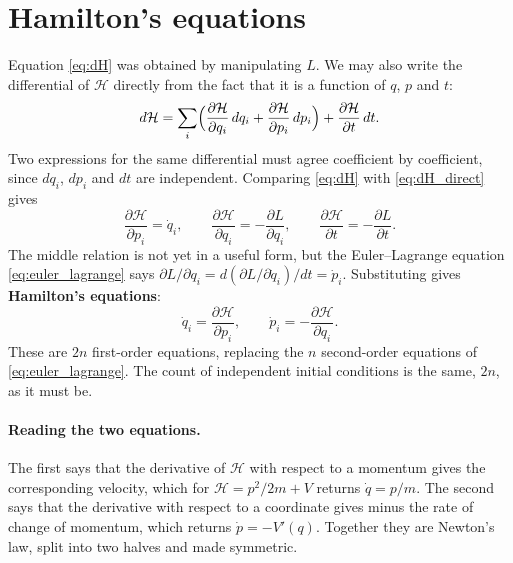 \documentclass[12pt]{article}
\newcommand{\Ham}{\mathcal{H}}
\begin{document}
\section{Hamilton's equations}
\label{sec:hamilton}

Equation \eqref{eq:dH} was obtained by manipulating $L$.  We may also
write the differential of $\Ham$ directly from the fact that it is a
function of $q$, $p$ and $t$:
%
\begin{equation}
  d\Ham = \sum_i\Bigl(\frac{\partial\Ham}{\partial q_i}\,dq_i
        + \frac{\partial\Ham}{\partial p_i}\,dp_i\Bigr)
        + \frac{\partial\Ham}{\partial t}\,dt .
  \label{eq:dH_direct}
\end{equation}
%
Two expressions for the same differential must agree coefficient by
coefficient, since $dq_i$, $dp_i$ and $dt$ are independent.  Comparing
\eqref{eq:dH} with \eqref{eq:dH_direct} gives
%
\begin{equation}
  \frac{\partial\Ham}{\partial p_i} = \dot q_i ,
  \qquad
  \frac{\partial\Ham}{\partial q_i} = -\frac{\partial L}{\partial q_i} ,
  \qquad
  \frac{\partial\Ham}{\partial t} = -\frac{\partial L}{\partial t} .
\end{equation}
%
The middle relation is not yet in a useful form, but the
Euler--Lagrange equation \eqref{eq:euler_lagrange} says
$\partial L/\partial q_i = d(\partial L/\partial\dot q_i)/dt = \dot p_i$.
Substituting gives \textbf{Hamilton's equations}:
%
\begin{equation}
  \boxed{\;
  \dot q_i = \frac{\partial\Ham}{\partial p_i} ,
  \qquad
  \dot p_i = -\frac{\partial\Ham}{\partial q_i} .
  \;}
  \label{eq:hamilton}
\end{equation}
%
These are $2n$ first-order equations, replacing the $n$ second-order
equations of \eqref{eq:euler_lagrange}.  The count of independent
initial conditions is the same, $2n$, as it must be.

\paragraph{Reading the two equations.}  The first says that the
derivative of $\Ham$ with respect to a momentum gives the corresponding
velocity, which for $\Ham = p^2/2m + V$ returns $\dot q = p/m$.  The
second says that the derivative with respect to a coordinate gives
minus the rate of change of momentum, which returns
$\dot p = -V'(q)$.  Together they are Newton's law, split into two
halves and made symmetric.
\end{document}

